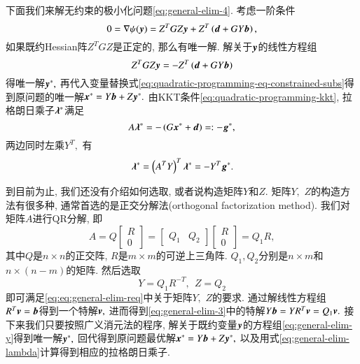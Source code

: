 下面我们来解无约束的极小化问题\eqref{eq:general-elim-4}. 考虑一阶条件
\begin{equation}
\label{eq:general-elim-5}
0 = \nabla \psi ({\bm{y}}) = Z^T G Z {\bm{y}} + Z^T \left( {\bm{d}} + G Y {\bm{b}} \right),
\end{equation}
如果既约Hessian阵$Z^T G Z$是正定的, 那么有唯一解. 解关于${\bm{y}}$的线性方程组
\begin{equation}
\label{eq:general-elim-y}
Z^T G Z {\bm{y}} = - Z^T \left( {\bm{d}} + G Y {\bm{b}} \right)
\end{equation}
得唯一解${\bm{y}}^*,$ 再代入变量替换式\eqref{eq:quadratic-programming-eq-constrained-subs}得到原问题的唯一解${\bm{x}}^* = Y {\bm{b}} + Z {\bm{y}}^*.$ 由KKT条件\eqref{eq:quadratic-programming-kkt}, 拉格朗日乘子${\bm{\lambda}}^*$满足
\begin{equation}
\label{eq:general-elim-lagrange}
A {\bm{\lambda}}^* = -\left( G {\bm{x}}^* + {\bm{d}} \right) =: - {\bm{g}}^*,
\end{equation}
两边同时左乘$Y^T,$ 有
\begin{equation}
\label{eq:general-elim-lambda}
{\bm{\lambda}}^* = \left( A^T Y \right)^T {\bm{\lambda}}^* = -Y^T {\bm{g}}^*.
\end{equation}

到目前为止, 我们还没有介绍如何选取, 或者说构造矩阵$Y$和$Z.$ 矩阵$Y,$ $Z$的构造方法有很多种, 通常首选的是正交分解法(orthogonal factorization method). 我们对矩阵$A$进行QR分解, 即
\begin{equation}
\label{eq:quadratic-programming-qr-decomp-1}
A = Q \begin{bmatrix} R \\ 0 \end{bmatrix} = \begin{bmatrix} Q_1 & Q_2 \end{bmatrix} \begin{bmatrix} R \\ 0 \end{bmatrix} = Q_1 R,
\end{equation}
其中$Q$是$n \times n$的正交阵, $R$是$m \times m$的可逆上三角阵. $Q_1, Q_2$分别是$n \times m$和$n \times (n - m)$的矩阵. 然后选取
\begin{equation}
\label{eq:quadratic-programming-qr-decomp-2}
Y = Q_1 R^{-T}, ~~ Z = Q_2
\end{equation}
即可满足\eqref{eq:eq:general-elim-req}中关于矩阵$Y,$ $Z$的要求. 通过解线性方程组$R^T {\bm{v}} = {\bm{b}}$得到一个特解${\bm{v}},$ 进而得到\eqref{eq:general-elim-3}中的特解$Y {\bm{b}} = Y R^T {\bm{v}} = Q_1 {\bm{v}}.$ 接下来我们只要按照广义消元法的程序, 解关于既约变量${\bm{y}}$的方程组\eqref{eq:general-elim-y}得到唯一解${\bm{y}}^*,$ 回代得到原问题最优解${\bm{x}}^* = Y {\bm{b}} + Z {\bm{y}}^*,$ 以及用式\eqref{eq:general-elim-lambda}计算得到相应的拉格朗日乘子.

